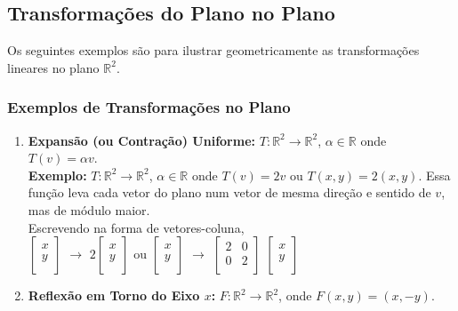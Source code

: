 \documentclass[oneside,a4paper,12pt]{article}
\begin{document}
\subsection{Transformações do Plano no Plano}
Os seguintes exemplos são para ilustrar geometricamente as transformações lineares no plano $\mathbb{R}^2$.

\subsubsection{Exemplos de Transformações no Plano}
\begin{enumerate}
	\item {\bf Expansão (ou Contração) Uniforme:} $T:\mathbb{R}^2 \rightarrow \mathbb{R}^2$, $\alpha \in \mathbb{R}$ onde $T(v) = \alpha v$. 
	\\ {\bf Exemplo:} $T:\mathbb{R}^2 \rightarrow \mathbb{R}^2$, $\alpha \in \mathbb{R}$ onde $T(v) = 2v$ ou $T(x,y) = 2(x,y)$. Essa função leva cada vetor do plano num vetor de mesma direção e sentido de $v$, mas de módulo maior.
	\vspace{150pt}
	\\ Escrevendo na forma de vetores-coluna,
	\\
	$\left[
	\begin{array}{c}
	x\\
	y \\
	\end{array}
	\right]$ $\rightarrow$ $2 \left[
	\begin{array}{c}
	x\\
	y \\
	\end{array}
	\right]$
	ou 
	$\left[
	\begin{array}{c}
	x\\
	y \\
	\end{array}
	\right]$ $\rightarrow$
	$\left[
	\begin{array}{cc}
	2	&	0\\
	0	&	2 \\
	\end{array}
	\right]$
	$\left[
	\begin{array}{c}
	x\\
	y \\
	\end{array}
	\right]$
	\item {\bf Reflexão em Torno do Eixo $x$:} $F:\mathbb{R}^2 \rightarrow \mathbb{R}^2$, onde $F(x,y) = (x,-y)$. 
	\\ \vspace{150pt}

\end{enumerate}
\end{document}
